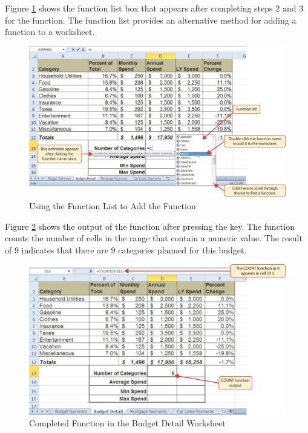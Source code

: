 Figure \ref{02:fig17} shows the function list box that appears after completing steps $ 2 $ and $ 3 $ for the  function. The function list provides an alternative method for adding a function to a worksheet.

\begin{figure}[H]
	\centering
	\includegraphics[width=\maxwidth{.95\linewidth}]{gfx/ch02_fig17}
	\caption{Using the Function List to Add the  Function}
	\label{02:fig17}
\end{figure}

Figure \ref{02:fig18} shows the output of the  function after pressing the  key. The function counts the number of cells in the range  that contain a numeric value. The result of $ 9 $ indicates that there are $ 9 $ categories planned for this budget.

\begin{figure}[H]
	\centering
	\includegraphics[width=\maxwidth{.95\linewidth}]{gfx/ch02_fig18}
	\caption{Completed  Function in the Budget Detail Worksheet}
	\label{02:fig18}
\end{figure}

